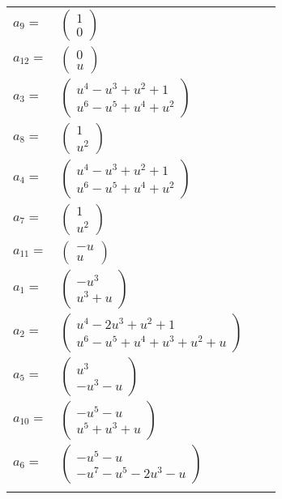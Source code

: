 \documentclass[1p]{elsarticle_modified}
\theoremstyle{definition}
\begin{document}
\begin{tabular}{m{7pt} m{180pt} m{7pt} m{180pt} }
\flushright $a_{9}=$&$\begin{pmatrix}1\\0\end{pmatrix}$ \\
\flushright $a_{12}=$&$\begin{pmatrix}0\\u\end{pmatrix}$ \\
\flushright $a_{3}=$&$\begin{pmatrix}u^4- u^3+u^2+1\\u^6- u^5+u^4+u^2\end{pmatrix}$ \\
\flushright $a_{8}=$&$\begin{pmatrix}1\\u^2\end{pmatrix}$ \\
\flushright $a_{4}=$&$\begin{pmatrix}u^4- u^3+u^2+1\\u^6- u^5+u^4+u^2\end{pmatrix}$ \\
\flushright $a_{7}=$&$\begin{pmatrix}1\\u^2\end{pmatrix}$ \\
\flushright $a_{11}=$&$\begin{pmatrix}- u\\u\end{pmatrix}$ \\
\flushright $a_{1}=$&$\begin{pmatrix}- u^3\\u^3+u\end{pmatrix}$ \\
\flushright $a_{2}=$&$\begin{pmatrix}u^4-2 u^3+u^2+1\\u^6- u^5+u^4+u^3+u^2+u\end{pmatrix}$ \\
\flushright $a_{5}=$&$\begin{pmatrix}u^3\\- u^3- u\end{pmatrix}$ \\
\flushright $a_{10}=$&$\begin{pmatrix}- u^5- u\\u^5+u^3+u\end{pmatrix}$ \\
\flushright $a_{6}=$&$\begin{pmatrix}- u^5- u\\- u^7- u^5-2 u^3- u\end{pmatrix}$\\&\end{tabular}
\end{document}
